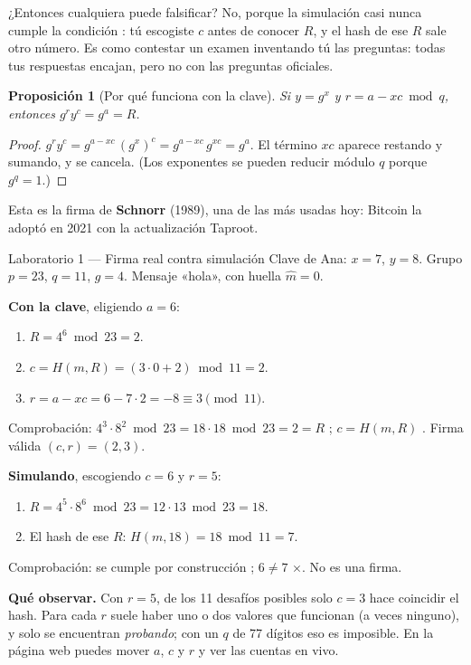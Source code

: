 \documentclass[11pt,a4paper]{article}
\theoremstyle{definition}
\theoremstyle{plain}
\newtheorem{proposicion}{Proposición}
\theoremstyle{remark}
\newcommand{\mh}{\hat{m}}
\newcommand{\si}{\textcolor{mintc}{\checkmark}}
\newcommand{\no}{\textcolor{coralc}{$\times$}}
\begin{document}
¿Entonces cualquiera puede falsificar? No, porque la simulación casi nunca cumple
la condición : tú escogiste $c$ antes de conocer $R$, y el hash de ese $R$
sale otro número. Es como contestar un examen inventando tú las preguntas: todas
tus respuestas encajan, pero no con las preguntas oficiales.

\begin{proposicion}[Por qué funciona con la clave]\label{prop:schnorr}
Si $y = g^{x}$ y $r = a - x c \bmod q$, entonces $g^{r} y^{c} = g^{a} = R$.
\end{proposicion}
\begin{proof}
$g^{r} y^{c} = g^{a - xc}\,(g^{x})^{c} = g^{a - xc}\, g^{xc} = g^{a}$. El término
$xc$ aparece restando y sumando, y se cancela. (Los exponentes se pueden reducir
módulo $q$ porque $g^{q} = 1$.)
\end{proof}

Esta es la firma de \textbf{Schnorr} (1989), una de las más usadas hoy: Bitcoin la
adoptó en 2021 con la actualización Taproot.

\begin{laboratorio}{Laboratorio 1 — Firma real contra simulación}
Clave de Ana: $x = 7$, $y = 8$. Grupo $p = 23$, $q = 11$, $g = 4$. Mensaje «hola»,
con huella $\mh = 0$.

\textbf{Con la clave}, eligiendo $a = 6$:
\begin{enumerate}[leftmargin=2em,itemsep=0.1em,topsep=0.2em]
  \item $R = 4^{6} \bmod 23 = 2$.
  \item $c = H(m, R) = (3\cdot 0 + 2) \bmod 11 = 2$.
  \item $r = a - x c = 6 - 7\cdot 2 = -8 \equiv 3 \pmod{11}$.
\end{enumerate}
Comprobación:  $4^{3}\cdot 8^{2} \bmod 23 = 18\cdot 18 \bmod 23 = 2 = R$
\si;  $c = H(m,R)$ \si. Firma válida $(c, r) = (2, 3)$.

\textbf{Simulando}, escogiendo $c = 6$ y $r = 5$:
\begin{enumerate}[leftmargin=2em,itemsep=0.1em,topsep=0.2em]
  \item $R = 4^{5}\cdot 8^{6} \bmod 23 = 12 \cdot 13 \bmod 23 = 18$.
  \item El hash de ese $R$: $H(m, 18) = 18 \bmod 11 = 7$.
\end{enumerate}
Comprobación:  se cumple por construcción \si;  $6 \neq 7$ \no.
No es una firma.

\textbf{Qué observar.} Con $r = 5$, de los 11 desafíos posibles solo $c = 3$ hace
coincidir el hash. Para cada $r$ suele haber uno o dos valores que funcionan (a
veces ninguno), y solo se encuentran \emph{probando}; con un $q$ de 77 dígitos eso es
imposible. En la página web puedes mover $a$, $c$ y $r$ y ver las cuentas en vivo.
\end{laboratorio}
\end{document}
